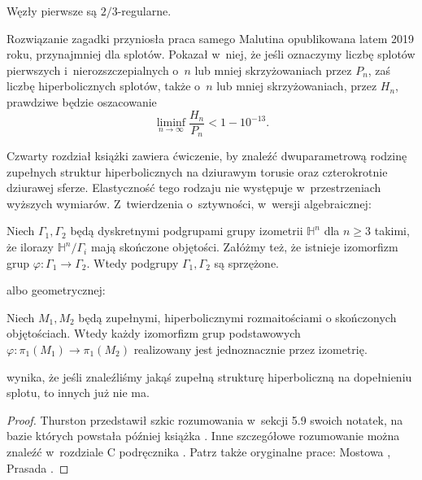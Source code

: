 \begin{conjecture}
    \label{con:malyutin4}
    Węzły pierwsze są $2/3$-regularne.
\end{conjecture}

Rozwiązanie zagadki przyniosła praca samego Malutina \cite{malyutin19} opublikowana latem 2019 roku, przynajmniej dla splotów.
Pokazał w~niej, że jeśli oznaczymy liczbę splotów pierwszych i~nierozszczepialnych o~$n$ lub mniej skrzyżowaniach przez $P_n$, zaś liczbę hiperbolicznych splotów, także o~$n$ lub mniej skrzyżowaniach, przez $H_n$, prawdziwe będzie oszacowanie
\begin{equation}
    \liminf_{n \to \infty} \frac{H_n}{P_n} < 1 - 10^{-13}.
\end{equation}

Czwarty rozdział książki \cite{purcell2020} zawiera ćwiczenie, by znaleźć dwuparametrową rodzinę zupełnych struktur hiperbolicznych na dziurawym torusie oraz czterokrotnie dziurawej sferze.
Elastyczność tego rodzaju nie występuje w~przestrzeniach wyższych wymiarów.
Z~twierdzenia o~sztywności, w~wersji algebraicznej:

\begin{theorem}
    Niech $\Gamma_1, \Gamma_2$ będą dyskretnymi podgrupami grupy izometrii $\mathbb H^n$ dla $n \ge 3$ takimi, że ilorazy $\mathbb H^n/\Gamma_i$ mają skończone objętości.
    Załóżmy też, że istnieje izomorfizm grup $\varphi \colon \Gamma_1 \to \Gamma_2$.
    Wtedy podgrupy $\Gamma_1, \Gamma_2$ są sprzężone.
\end{theorem}

albo geometrycznej:

\begin{theorem}
    Niech $M_1, M_2$ będą zupełnymi, hiperbolicznymi rozmaitościami o skończonych objętościach.
    Wtedy każdy izomorfizm grup podstawowych $\varphi \colon \pi_1(M_1) \to \pi_1(M_2)$ realizowany jest jednoznacznie przez izometrię.
\end{theorem}

wynika, że jeśli znaleźliśmy jakąś zupełną strukturę hiperboliczną na dopełnieniu splotu, to innych już nie ma.

\begin{proof}
    Thurston przedstawił szkic rozumowania w~sekcji 5.9 swoich notatek, na bazie których powstała później książka \cite{thurston97}.
    Inne szczegółowe rozumowanie można znaleźć w~rozdziale C podręcznika \cite{benedetti92}.
    Patrz także oryginalne prace: Mostowa \cite{mostow73}, Prasada \cite{prasad73}.
\end{proof}

